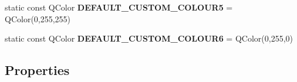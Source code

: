 \begin{DoxyCompactItemize}
\item 
\hypertarget{class_console_widget_aad9ca0556290f9d68e01f13390acee04}{static const Q\-Color {\bfseries D\-E\-F\-A\-U\-L\-T\-\_\-\-C\-U\-S\-T\-O\-M\-\_\-\-C\-O\-L\-O\-U\-R5} = Q\-Color(0,255,255)}\label{class_console_widget_aad9ca0556290f9d68e01f13390acee04}

\item 
\hypertarget{class_console_widget_a29de764d1511c834b28247784a115b4d}{static const Q\-Color {\bfseries D\-E\-F\-A\-U\-L\-T\-\_\-\-C\-U\-S\-T\-O\-M\-\_\-\-C\-O\-L\-O\-U\-R6} = Q\-Color(0,255,0)}\label{class_console_widget_a29de764d1511c834b28247784a115b4d}

\end{DoxyCompactItemize}
\subsection*{Properties}
